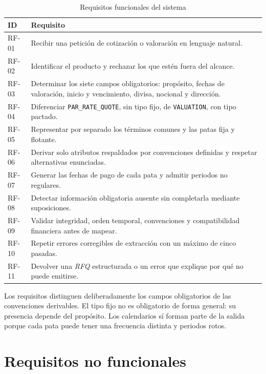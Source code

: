 \begin{table}[H]
\centering
\small
\caption{Requisitos funcionales del sistema}
\label{tab:requisitos_funcionales}
\begin{tabular}{|P{1.8cm}|P{11.8cm}|}
\hline
\textbf{ID} & \textbf{Requisito} \\
\hline
RF-01 & Recibir una petición de cotización o valoración en lenguaje natural. \\
\hline
RF-02 & Identificar el producto y rechazar los que estén fuera del alcance. \\
\hline
RF-03 & Determinar los siete campos obligatorios: propósito, fechas de valoración, inicio y vencimiento, divisa, nocional y dirección. \\
\hline
RF-04 & Diferenciar \texttt{PAR\_RATE\_QUOTE}, sin tipo fijo, de \texttt{VALUATION}, con tipo pactado. \\
\hline
RF-05 & Representar por separado los términos comunes y las patas fija y flotante. \\
\hline
RF-06 & Derivar solo atributos respaldados por convenciones definidas y respetar alternativas enunciadas. \\
\hline
RF-07 & Generar las fechas de pago de cada pata y admitir periodos no regulares. \\
\hline
RF-08 & Detectar información obligatoria ausente sin completarla mediante suposiciones. \\
\hline
RF-09 & Validar integridad, orden temporal, convenciones y compatibilidad financiera antes de mapear. \\
\hline
RF-10 & Repetir errores corregibles de extracción con un máximo de cinco pasadas. \\
\hline
RF-11 & Devolver una \textit{RFQ} estructurada o un error que explique por qué no puede emitirse. \\
\hline
\end{tabular}
\end{table}

Los requisitos distinguen deliberadamente los campos obligatorios de las convenciones derivables. El tipo fijo no es obligatorio de forma general: su presencia depende del propósito. Los calendarios sí forman parte de la salida porque cada pata puede tener una frecuencia distinta y periodos rotos.

\section{Requisitos no funcionales}
\label{sec:requisitos_no_funcionales}

